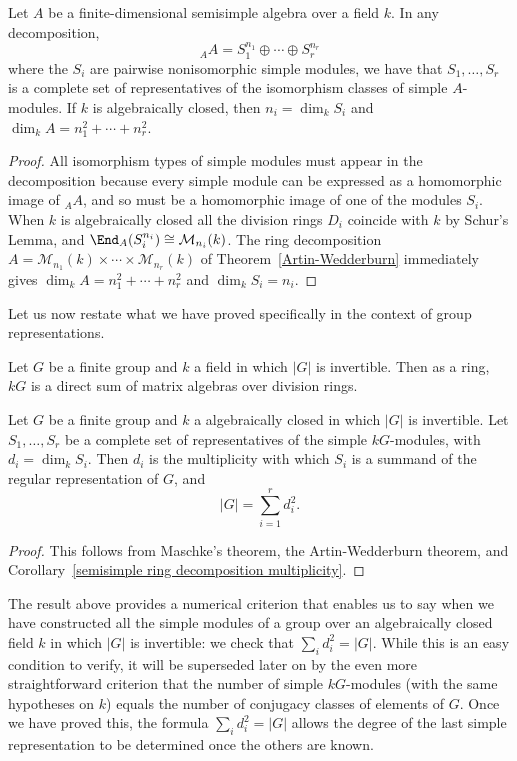 \begin{corollary}\label{semisimple ring decomposition multiplicity}
Let $A$ be a finite-dimensional semisimple algebra over a field $k$. In any decomposition,
\[_{A}A=S_1^{n_1}\oplus\cdots\oplus S_r^{n_r}\]
where the $S_i$ are pairwise nonisomorphic simple modules, we have that $S_1,\dots,S_r$ is a complete set of representatives of the isomorphism classes of simple $A$-modules. If $k$ is algebraically closed, then $n_i=\dim_kS_i$ and $\dim_k A=n_1^2+\cdots+n_r^2$.
\end{corollary}
\begin{proof}
All isomorphism types of simple modules must appear in the decomposition because every simple module can be expressed as a homomorphic image of $_{A}A$, and so must be a homomorphic image of one of the modules $S_i$. When $k$ is algebraically closed all the division rings $D_i$ coincide with $k$ by Schur's Lemma, and $\End_A(S_i^{n_i})\cong\mathcal{M}_{n_i}(k)$. The ring decomposition $A=\mathcal{M}_{n_1}(k)\times\cdots\times\mathcal{M}_{n_r}(k)$ of Theorem~\ref{Artin-Wedderburn} immediately gives $\dim_kA=n_1^2+\cdots+n_r^2$ and $\dim_kS_i=n_i$.
\end{proof}
Let us now restate what we have proved specifically in the context of group representations.
\begin{corollary}
Let $G$ be a finite group and $k$ a field in which $|G|$ is invertible. Then as a ring, $kG$ is a direct sum of matrix algebras over division rings.
\end{corollary}
\begin{corollary}\label{representation degree sum formula}
Let $G$ be a finite group and $k$ a algebraically closed in which $|G|$ is invertible. Let $S_1,\dots,S_r$ be a complete set of representatives of the simple $kG$-modules, with $d_i=\dim_kS_i$. Then $d_i$ is the multiplicity with which $S_i$ is a summand of the regular representation of $G$, and
\[|G|=\sum_{i=1}^{r}d_i^2.\]
\end{corollary}
\begin{proof}
This follows from Maschke's theorem, the Artin-Wedderburn theorem, and Corollary~\ref{semisimple ring decomposition multiplicity}.
\end{proof}
The result above provides a numerical criterion that enables us to say when we have constructed all the simple modules of a group over an algebraically closed field $k$ in which $|G|$ is invertible: we check that $\sum_id_i^2=|G|$. While this is an easy condition to verify, it will be superseded later on by the even more straightforward criterion that the number of simple $kG$-modules (with the same hypotheses on $k$) equals the number of conjugacy classes of elements of $G$. Once we have proved this, the formula $\sum_id_i^2=|G|$ allows the degree of the last simple representation to be determined once the others are known.

